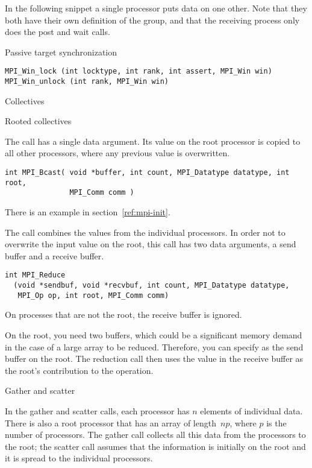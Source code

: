 In the following snippet a single processor puts data on one
other. Note that they both have their own definition of the group, and
that the receiving process only does the post and wait calls.

 {Passive target synchronization}

\begin{verbatim}
MPI_Win_lock (int locktype, int rank, int assert, MPI_Win win)
MPI_Win_unlock (int rank, MPI_Win win)
\end{verbatim}


 {Collectives}

 {Rooted collectives}

The  call has a single data argument. Its
value on the root processor is copied to all other processors,
where any previous value is overwritten.
\begin{verbatim}
int MPI_Bcast( void *buffer, int count, MPI_Datatype datatype, int root, 
               MPI_Comm comm )
\end{verbatim}
There is an example in section~\ref{ref:mpi-init}.

The  call combines the values from the individual
processors. In order not to overwrite the input value on the root, 
this call has two data arguments, a send buffer and a receive buffer.
\begin{verbatim}
int MPI_Reduce
  (void *sendbuf, void *recvbuf, int count, MPI_Datatype datatype, 
   MPI_Op op, int root, MPI_Comm comm)
\end{verbatim}
On processes that are not the root, the receive buffer is ignored. 

On the root, 
you need two buffers, which could be a significant memory demand
in the case of a large array to be reduced.
Therefore, you can specify  as the send
buffer on the root. The reduction call then
uses the value in the receive buffer as the root's contribution to the operation.

 {Gather and scatter}

In the gather and scatter calls, each processor has $n$ elements of individual
data. There is also a root processor that has an array of length~$np$, where $p$
is the number of processors. The gather call collects all this data from the 
processors to the root; the scatter call assumes that the information is 
initially on the root and it is spread to the individual processors.

